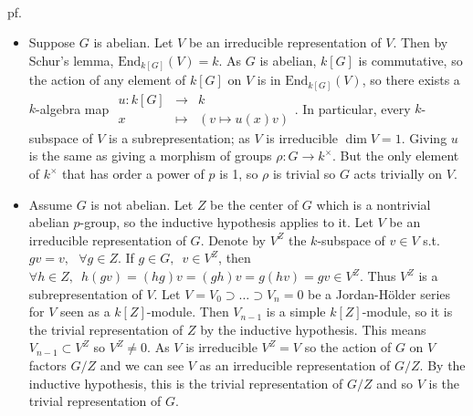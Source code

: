 \documentclass[12pt,letterpaper]{report}
\begin{document}
\\pf.\begin{itemize}\item Suppose $G$ is abelian. Let $V$ be an irreducible representation of $V$. Then by Schur's lemma, $\text{End}_{k[G]}(V)=k$. As $G$ is abelian, $k[G]$ is commutative, so the action of any element of $k[G]$ on $V$ is in $\text{End}_{k[G]}(V)$, so there exists a $k$-algebra map $\begin{array}{rrr}u:k[G]&\rightarrow &k\\x&\mapsto&(v\mapsto u(x)v)\end{array}$. In particular, every $k$-subspace of $V$ is a subrepresentation; as $V$ is irreducible $\dim V=1$. Giving $u$ is the same as giving a morphism of groups $\rho:G\rightarrow k^{\times}$. But the only element of $k^{\times}$ that has order a power of $p$ is 1, so $\rho$ is trivial so $G$ acts trivially on $V$.
\item Assume $G$ is not abelian. Let $Z$ be the center of $G$ which is a nontrivial abelian $p$-group, so the inductive hypothesis applies to it. Let $V$ be an irreducible representation of $G$. Denote by $V^{Z}$ the $k$-subspace of $v\in V$ s.t. $gv=v,\,\,\,\,\forall g\in Z$. If $g\in G,\,\,\,v\in V^{Z}$, then $\forall h\in Z,\,\,\,h(gv)=(hg)v=(gh)v=g(hv)=gv\in V^{Z}$. Thus $V^{Z}$ is a subrepresentation of $V$. Let $V=V_{0}\supset\dots\supset V_{n}=0$ be a Jordan-H\"older series for $V$ seen as a $k[Z]$-module. Then $V_{n-1}$ is a simple $k[Z]$-module, so it is the trivial representation of $Z$ by the inductive hypothesis. This means $V_{n-1}\subset V^{Z}$ so $V^{Z}\neq0$. As $V$ is irreducible $V^{Z}=V$ so the action of $G$ on $V$ factors $G/Z$ and we can see $V$ as an irreducible representation of $G/Z$. By the inductive hypothesis, this is the trivial representation of $G/Z$ and so $V$ is the trivial representation of $G$.\end{itemize}
\end{document}
